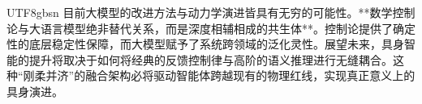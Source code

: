 \documentclass[11pt,a4paper]{article}
\begin{document}
\begin{CJK*}{UTF8}{gbsn}
目前大模型的改进方法与动力学演进皆具有无穷的可能性。**数学控制论与大语言模型绝非替代关系，而是深度相辅相成的共生体**。控制论提供了确定性的底层稳定性保障，而大模型赋予了系统跨领域的泛化灵性。展望未来，具身智能的提升将取决于如何将经典的反馈控制律与高阶的语义推理进行无缝耦合。这种“刚柔并济”的融合架构必将驱动智能体跨越现有的物理红线，实现真正意义上的具身演进。

\newpage

\end{CJK*}
\end{document}
